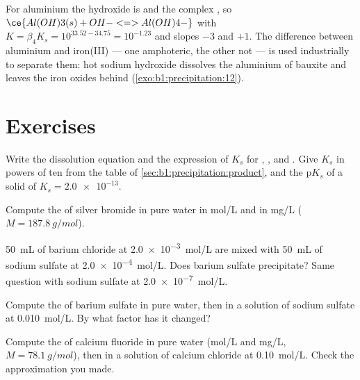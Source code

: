 For aluminium the hydroxide is  and the complex ,
so $\ce{Al(OH)3(s) + OH- <=> Al(OH)4-}$ with $K = \beta_4 K_s = 10^{33.52
- 34.75} = 10^{-1.23}$ and slopes $-3$ and $+1$. The difference between
aluminium and iron(III) --- one amphoteric, the other not --- is used
industrially to separate them: hot sodium hydroxide dissolves the
aluminium of bauxite and leaves the iron oxides behind
(\cref{exo:b1:precipitation:12}).

\section{Exercises}

\begin{exercise}[$\star$]\label{exo:b1:precipitation:1}
Write the dissolution equation and the expression of $K_s$ for
, ,  and . Give $K_s$ in powers
of ten from the table of \cref{sec:b1:precipitation:product}, and the $\mathrm{p}K_s$ of a
solid of $K_s = \num{2.0e-13}$.
\end{exercise}

\begin{exercise}[$\star$]\label{exo:b1:precipitation:2}
Compute the  of silver bromide in pure water in \unit{mol/L}
and in \unit{mg/L} ($M = \qty{187.8}{g/mol}$).
\end{exercise}

\begin{exercise}[$\star$]\label{exo:b1:precipitation:3}
\qty{50}{mL} of barium chloride at \qty{2.0e-3}{mol/L} are mixed with
\qty{50}{mL} of sodium sulfate at \qty{2.0e-4}{mol/L}. Does barium
sulfate precipitate? Same question with sodium sulfate at
\qty{2.0e-7}{mol/L}.
\end{exercise}

\begin{exercise}[$\star$]\label{exo:b1:precipitation:4}
Compute the  of barium sulfate in pure water, then in a
solution of sodium sulfate at \qty{0.010}{mol/L}. By what factor has it
changed?
\end{exercise}

\begin{exercise}[$\star\star$]\label{exo:b1:precipitation:5}
Compute the  of calcium fluoride in pure water (\unit{mol/L} and
\unit{mg/L}, $M = \qty{78.1}{g/mol}$), then in a solution of calcium
chloride at \qty{0.10}{mol/L}. Check the approximation you made.
\end{exercise}

